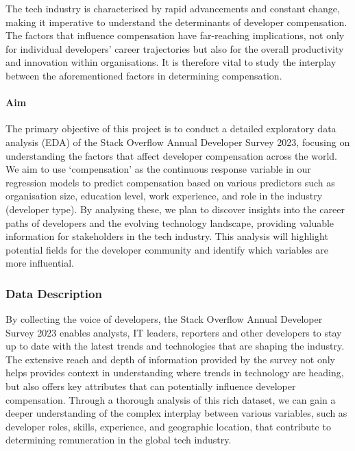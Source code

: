\documentclass[
  12pt,
]{article}
\begin{document}
The tech industry is characterised by rapid advancements and constant
change, making it imperative to understand the determinants of developer
compensation. The factors that influence compensation have far-reaching
implications, not only for individual developers' career trajectories
but also for the overall productivity and innovation within
organisations. It is therefore vital to study the interplay between the
aforementioned factors in determining compensation.

\hypertarget{aim}{%
\paragraph{Aim}\label{aim}}

The primary objective of this project is to conduct a detailed
exploratory data analysis (EDA) of the Stack Overflow Annual Developer
Survey 2023, focusing on understanding the factors that affect developer
compensation across the world. We aim to use `compensation' as the
continuous response variable in our regression models to predict
compensation based on various predictors such as organisation size,
education level, work experience, and role in the industry (developer
type). By analysing these, we plan to discover insights into the career
paths of developers and the evolving technology landscape, providing
valuable information for stakeholders in the tech industry. This
analysis will highlight potential fields for the developer community and
identify which variables are more influential.

\hypertarget{data-description}{%
\subsubsection{Data Description}\label{data-description}}

By collecting the voice of developers, the Stack Overflow Annual
Developer Survey 2023 enables analysts, IT leaders, reporters and other
developers to stay up to date with the latest trends and technologies
that are shaping the industry. The extensive reach and depth of
information provided by the survey not only helps provides context in
understanding where trends in technology are heading, but also offers
key attributes that can potentially influence developer compensation.
Through a thorough analysis of this rich dataset, we can gain a deeper
understanding of the complex interplay between various variables, such
as developer roles, skills, experience, and geographic location, that
contribute to determining remuneration in the global tech industry.
\end{document}

